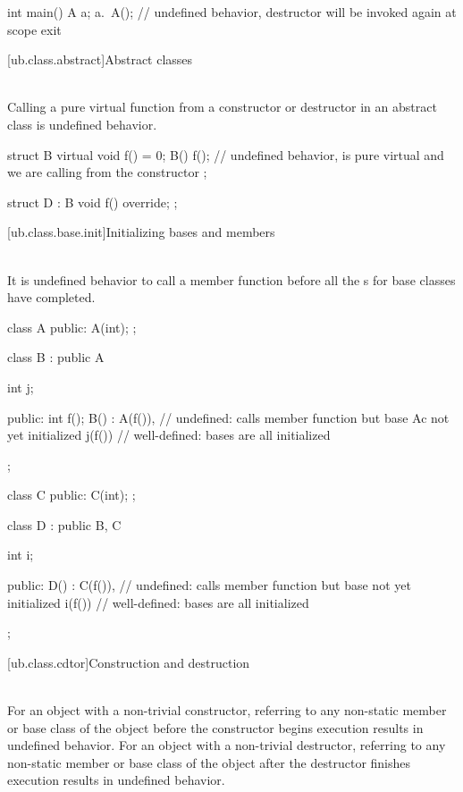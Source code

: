 {\begin{example}
\begin{codeblock}
int main() {
  A a;
  a.~A();       // undefined behavior, destructor will be invoked again at scope exit
}
\end{codeblock}
\end{example}


[ub.class.abstract]{Abstract classes}

\pnum
{} \\
Calling a pure virtual function from a constructor or destructor in an abstract class is undefined behavior.

\pnum
\begin{example}
\begin{codeblock}
struct B {
  virtual void f() = 0;
  B() {
    f();        // undefined behavior,  is pure virtual and we are calling from the constructor
  }
};

struct D : B {
  void f() override;
};
\end{codeblock}
\end{example}


[ub.class.base.init]{Initializing bases and members}

\pnum
{} \\
It is undefined behavior to call a member function before all the s for base classes have completed.

\pnum
\begin{example}
\begin{codeblock}
class A {
public:
  A(int);
};

class B : public A {
  int j;

public:
  int f();
  B()
      : A(f()),         // undefined: calls member function but base Ac not yet initialized
        j(f()) {}       // well-defined: bases are all initialized
};

class C {
public:
  C(int);
};

class D : public B, C {
  int i;

public:
  D()
      : C(f()),         // undefined: calls member function but base  not yet initialized
        i(f()) {}       // well-defined: bases are all initialized
};
\end{codeblock}
\end{example}


[ub.class.cdtor]{Construction and destruction}

\pnum
{} \\
For an object with a non-trivial constructor, referring to any non-static member or base class of the object
before the constructor begins execution results in undefined behavior. For an object with a non-trivial
destructor, referring to any non-static member or base class of the object after the destructor finishes execution
results in undefined behavior.

}
